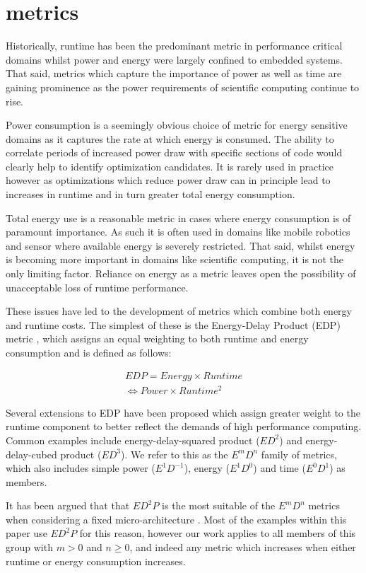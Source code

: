 \section{metrics }
\label{sec:metrics}
Historically, runtime has been the predominant metric in performance critical domains whilst power and energy were largely confined to embedded systems.
That said, metrics which capture the importance of power as well as time are gaining prominence as the power requirements of scientific computing continue to rise.


Power consumption is a seemingly obvious choice of metric for energy sensitive domains as it captures the rate at which energy is consumed.
The ability to correlate periods of increased power draw with specific sections of code would clearly help to identify optimization candidates.
It is rarely used in practice however as optimizations which reduce power draw can in principle lead to increases in runtime and in turn greater total energy consumption.

Total energy use is a reasonable metric in cases where energy consumption is of paramount importance.
As such it is often used in domains like mobile robotics and sensor where available energy is severely restricted.
That said, whilst energy is becoming more important in domains like scientific computing, it is not the only limiting factor. 
Reliance on energy as a metric leaves open the possibility of unacceptable loss of runtime performance.

These issues have led to the development of metrics which combine both energy and runtime costs.
The simplest of these is the Energy-Delay Product (EDP) metric \cite{gonzales:1995aa}, which assigns an equal weighting to both runtime and energy consumption and is defined as follows:

\begin{align}
  EDP = Energy \times Runtime \nonumber \\
      \Leftrightarrow Power \times Runtime^{2} 
  \label{eq:edp}
\end{align}

Several extensions to EDP have been proposed which assign greater weight to the runtime component to better reflect the demands of high performance computing.
Common examples include energy-delay-squared product ($ED^{2}$) and energy-delay-cubed product ($ED^{3}$).
We refer to this as the $E^mD^n$ family of metrics, which also includes simple power ($E^1D^{-1}$), energy ($E^1D^0$) and time ($E^0D^1$) as members.

It has been argued that that $ED^{2}P$ is the most suitable of the $E^mD^n$ metrics when considering a fixed micro-architecture \cite{brooks:2000aa}. Most of the examples within this paper use $ED^2P$ for this reason, however our work applies to all members of this group with $m > 0$ and $n \geq 0$, and indeed any metric which increases when either runtime or energy consumption increases.
